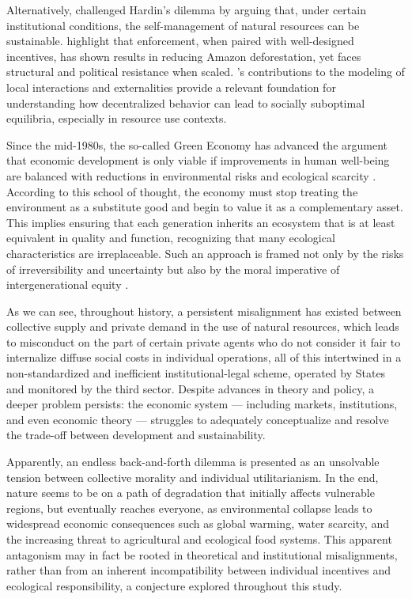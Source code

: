 Alternatively,  challenged Hardin’s dilemma by arguing that, under certain institutional conditions, the self-management of natural resources can be sustainable.  highlight that enforcement, when paired with well-designed incentives, has shown results in reducing Amazon deforestation, yet faces structural and political resistance when scaled. ’s contributions to the modeling of local interactions and externalities provide a relevant foundation for understanding how decentralized behavior can lead to socially suboptimal equilibria, especially in resource use contexts. 

Since the mid-1980s, the so-called Green Economy has advanced the argument that economic development is only viable if improvements in human well-being are balanced with reductions in environmental risks and ecological scarcity \cite{jacobs1991green}. According to this school of thought, the economy must stop treating the environment as a substitute good and begin to value it as a complementary asset. This implies ensuring that each generation inherits an ecosystem that is at least equivalent in quality and function, recognizing that many ecological characteristics are irreplaceable. Such an approach is framed not only by the risks of irreversibility and uncertainty but also by the moral imperative of intergenerational equity \cite{pearce1989blueprint}.

As we can see, throughout history, a persistent misalignment has existed between collective supply and private demand in the use of natural resources, which leads to misconduct on the part of certain private agents who do not consider it fair to internalize diffuse social costs in individual operations, all of this intertwined in a non-standardized and inefficient institutional-legal scheme, operated by States and monitored by the third sector. Despite advances in theory and policy, a deeper problem persists: the economic system — including markets, institutions, and even economic theory — struggles to adequately conceptualize and resolve the trade-off between development and sustainability. 

Apparently, an endless back-and-forth dilemma is presented as an unsolvable tension between collective morality and individual utilitarianism. In the end, nature seems to be on a path of degradation that initially affects vulnerable regions, but eventually reaches everyone, as environmental collapse leads to widespread economic consequences such as global warming, water scarcity, and the increasing threat to agricultural and ecological food systems. This apparent antagonism may in fact be rooted in theoretical and institutional misalignments, rather than from an inherent incompatibility between individual incentives and ecological responsibility, a conjecture explored throughout this study.

